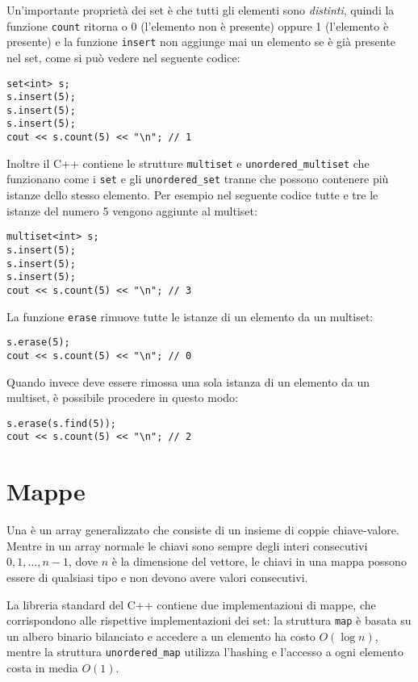Un'importante proprietà dei set è che tutti gli elementi
sono \emph{distinti}, quindi la funzione \texttt{count}
ritorna o 0 (l'elemento non è presente) oppure 1 
(l'elemento è presente) e la funzione 
\texttt{insert} non aggiunge mai un elemento
se è già presente nel set, come si può vedere
nel seguente codice:

\begin{lstlisting}
set<int> s;
s.insert(5);
s.insert(5);
s.insert(5);
cout << s.count(5) << "\n"; // 1
\end{lstlisting}

Inoltre il C++ contiene le strutture
\texttt{multiset} e \texttt{unordered\_multiset}
che funzionano come i \texttt{set}
e gli \texttt{unordered\_set}
tranne che possono contenere più istanze dello stesso elemento.
Per esempio nel seguente codice tutte e tre le istanze del
numero 5 vengono aggiunte al multiset:

\begin{lstlisting}
multiset<int> s;
s.insert(5);
s.insert(5);
s.insert(5);
cout << s.count(5) << "\n"; // 3
\end{lstlisting}
La funzione \texttt{erase} rimuove tutte
le istanze di un elemento da un multiset:
\begin{lstlisting}
s.erase(5);
cout << s.count(5) << "\n"; // 0
\end{lstlisting}
Quando invece deve essere rimossa una sola istanza
di un elemento da un multiset,
è possibile procedere in questo modo:
\begin{lstlisting}
s.erase(s.find(5));
cout << s.count(5) << "\n"; // 2
\end{lstlisting}

\section{Mappe}


Una  è un array generalizzato
che consiste di un insieme di coppie chiave-valore.
Mentre in un array normale le chiavi sono sempre
degli interi consecutivi $0,1,\ldots,n-1$,
dove $n$ è la dimensione del vettore,
le chiavi in una mappa possono essere di qualsiasi tipo
e non devono avere valori consecutivi.

La libreria standard del C++ contiene
due implementazioni di mappe, che corrispondono
alle rispettive implementazioni dei set: la struttura
\texttt{map} è basata su un albero binario bilanciato
e accedere a un elemento ha costo $O(\log n)$,
mentre la struttura
\texttt{unordered\_map} utilizza l'hashing
e l'accesso a ogni elemento costa in media $O(1)$.

